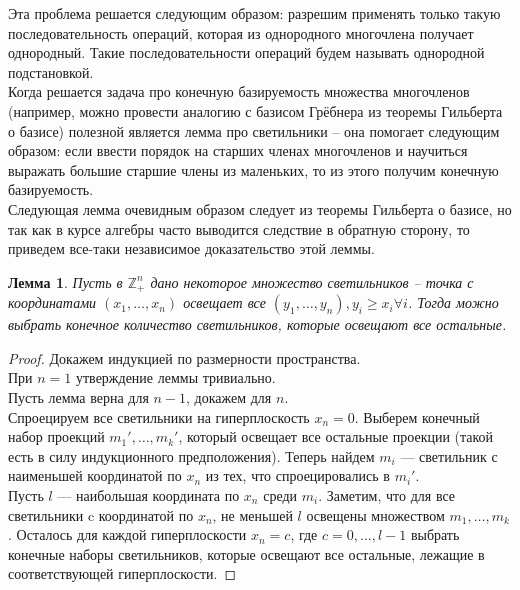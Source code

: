 \documentclass[12pt,a4paper]{article}
\newtheorem{lemma}{Лемма}[section]
\begin{document}
    Эта проблема решается следующим образом: разрешим применять только такую последовательность операций, которая из однородного многочлена получает однородный. Такие последовательности операций будем называть однородной подстановкой.\\
    Когда решается задача про конечную базируемость множества многочленов (например, можно провести аналогию с базисом Грёбнера из теоремы Гильберта о базисе) полезной является лемма про светильники -- она помогает следующим образом: если ввести порядок на старших членах многочленов и научиться выражать большие старшие члены из маленьких, то из этого получим конечную базируемость.\\
    Следующая лемма очевидным образом следует из теоремы Гильберта о базисе, но так как в курсе алгебры часто выводится следствие в обратную сторону, то приведем все-таки независимое доказательство этой леммы.\vskip 0.1in\noindent
    \begin{lemma}
        \label{lamp}
        Пусть в $\mathbb{Z}_+^n$ дано некоторое множество светильников -- точка с координатами $(x_1,\ldots,x_n)$ освещает все $(y_1,\ldots,y_n), y_i\geq x_i \forall i$. Тогда можно выбрать конечное количество светильников, которые освещают все остальные.
    \end{lemma}
    \begin{proof}
        Докажем индукцией по размерности пространства.\\
        При $n=1$ утверждение леммы тривиально.\\
        Пусть лемма верна для $n-1$, докажем для $n$. \\
        Спроецируем все светильники на гиперплоскость $x_n=0$. Выберем конечный набор проекций $m_1',\ldots,m_k'$, который освещает все остальные проекции (такой есть в силу индукционного предположения). Теперь найдем $m_i$ --- светильник с наименьшей координатой по $x_n$ из тех, что спроецировались в $m_i'$.\\
        Пусть $l$ --- наибольшая координата по $x_n$ среди $m_i$. Заметим, что для все светильники c координатой по $x_n$, не меньшей $l$ освещены множеством $m_1,\ldots,m_k$. Осталось для каждой гиперплоскости $x_n=c$, где $c=0,\ldots,l-1$ выбрать конечные наборы светильников, которые освещают все остальные, лежащие в соответствующей гиперплоскости.
    \end{proof}
\end{document}

